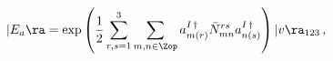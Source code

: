 \begin{equation}\label{bv}
|E_a\ra = \exp\left(\frac{1}{2}
\sum_{r,s=1}^3\sum_{m,n\in\Zop}a^{I\,\dag}_{m(r)}\bar{N}^{rs}_{mn}a^{I\,\dag}_{n(s)}
\right)|v\ra_{123}\,,
\end{equation}

